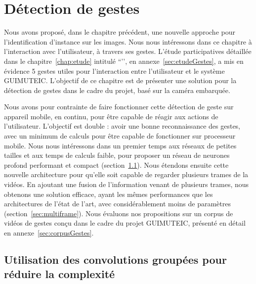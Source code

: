 \chapter{Détection de gestes}
\label{chap:gestes}

Nous avons proposé, dans le chapitre précédent, une nouvelle approche pour l'identification d'instance sur les images.
Nous nous intéressons dans ce chapitre à l'interaction avec l'utilisateur, à travers ses gestes.
L'étude participatives détaillée dans le chapitre~\ref{chap:etude} intitulé ``’’, en annexe~\ref{sec:etudeGestes}, a mis en évidence 5 gestes utiles pour l'interaction entre l'utilisateur et le système GUIMUTEIC.
L'objectif de ce chapitre est de présenter une solution pour la détection de gestes dans le cadre du projet, basé sur la caméra embarquée.

Nous avons pour contrainte de faire fonctionner cette détection de geste sur appareil mobile, en continu, pour être capable de réagir aux actions de l'utilisateur.
L'objectif est double : avoir une bonne reconnaissance des gestes, avec un minimum de calculs pour être capable de fonctionner sur processeur mobile.
Nous nous intéressons dans un premier temps aux réseaux de petites tailles et aux temps de calculs faible, pour proposer un réseau de neurones profond performant et compact (section~\ref{sec:reseausimple}).
Nous étendons ensuite cette nouvelle architecture pour qu'elle soit capable de regarder plusieurs trames de la vidéos.
En ajoutant une fusion de l'information venant de plusieurs trames, nous obtenons une solution efficace, ayant les mêmes performances que les architectures de l'état de l'art, avec considérablement moins de paramètres (section~\ref{sec:multiframe}).
Nous évaluons nos propositions sur un corpus de vidéos de gestes conçu dans le cadre du projet GUIMUTEIC, présenté en détail en annexe~\ref{sec:corpusGestes}.


%
%
%
\section{Utilisation des convolutions groupées pour réduire la complexité}
\label{sec:reseausimple}

